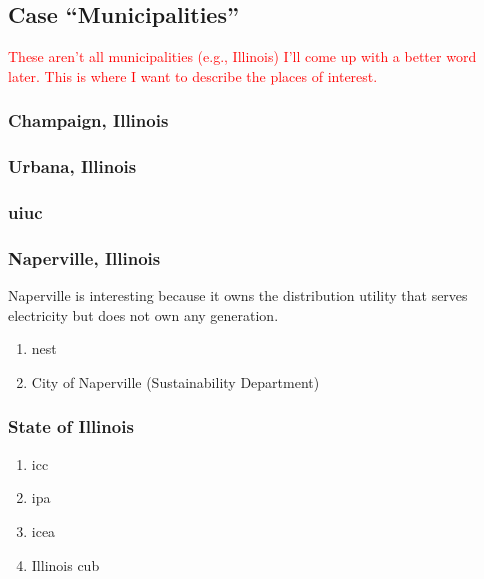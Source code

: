 \subsection{Case ``Municipalities''}

\textcolor{red}{These aren't all municipalities (e.g., Illinois) I'll come up with 
a better word later. This is where I want to describe the places of interest.}

\subsubsection{Champaign, Illinois}
\subsubsection{Urbana, Illinois}
\subsubsection{\acf{uiuc}}
\subsubsection{Naperville, Illinois}
Naperville is interesting because it owns the distribution utility that serves electricity
but does not own any generation.
\begin{enumerate}
    \item \ac{nest}
    \item City of Naperville (Sustainability Department)
\end{enumerate}
\subsubsection{State of Illinois}
\begin{enumerate}
    \item \ac{icc}
    \item \ac{ipa}
    \item \ac{icea}
    \item Illinois \ac{cub}
\end{enumerate}







